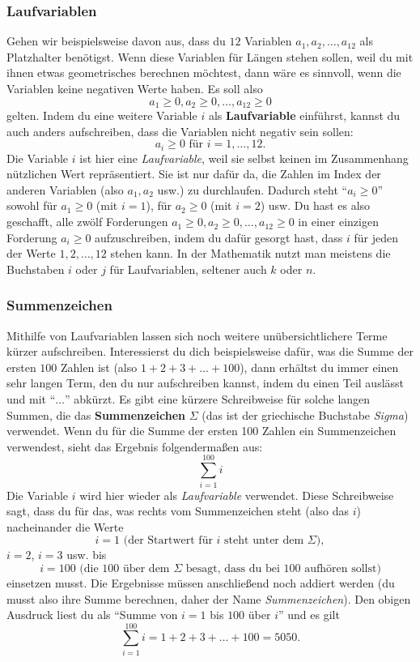 \documentclass[../../main.tex]{subfiles}
\begin{document}
\subsubsection*{Laufvariablen}
Gehen wir beispielsweise davon aus, dass du $12$ Variablen $a_1,a_2,\dots,a_{12}$ als Platzhalter benötigst. Wenn diese
Variablen für Längen stehen sollen, weil du mit ihnen etwas geometrisches berechnen möchtest, dann wäre es sinnvoll,
wenn die Variablen keine negativen Werte haben. Es soll also 
\[a_1\geq 0, a_2\geq 0,\dots,a_{12}\geq 0\] 
gelten. Indem du eine weitere Variable $i$ als \textbf{Laufvariable} einführst, kannst du auch anders aufschreiben, dass
die Variablen nicht negativ sein sollen: 
\[a_i\geq 0 \text{ für } i=1,\dots,12.\]
Die Variable $i$ ist hier eine \emph{Laufvariable}, weil sie selbst keinen im Zusammenhang nützlichen Wert repräsentiert.
Sie ist nur dafür da, die Zahlen im Index der anderen Variablen (also $a_1,a_2$ usw.) zu durchlaufen. Dadurch steht
\enquote{$a_i\geq 0$} sowohl für $a_1\geq 0$ (mit $i=1$), für $a_2\geq 0$ (mit $i=2$) usw. Du hast es also geschafft,
alle zwölf Forderungen $a_1\geq 0, a_2\geq 0,\dots,a_{12}\geq 0$ in einer einzigen Forderung $a_i\geq 0$ aufzuschreiben,
indem du dafür gesorgt hast, dass $i$ für jeden der Werte $1,2,\dots,12$ stehen kann. In der Mathematik nutzt man
meistens die Buchstaben $i$ oder $j$ für Laufvariablen, seltener auch $k$ oder $n$.

\subsubsection*{Summenzeichen}
Mithilfe von Laufvariablen lassen sich noch weitere unübersichtlichere Terme kürzer aufschreiben. Interessierst du dich
beispielsweise dafür, was die Summe der ersten $100$ Zahlen ist (also $1+2+3+\dots+100$), dann erhältst du immer einen
sehr langen Term, den du nur aufschreiben kannst, indem du einen Teil auslässt und mit \enquote{$\dots$} abkürzt. Es
gibt eine kürzere Schreibweise für solche langen Summen, die das \textbf{Summenzeichen} $\Sigma$ (das ist der
griechische Buchstabe \emph{Sigma}) verwendet. Wenn du für die Summe der ersten 100 Zahlen ein Summenzeichen verwendest,
sieht das Ergebnis folgendermaßen aus:
\[\sum_{i=1}^{100}i\]
Die Variable $i$ wird hier wieder als \emph{Laufvariable} verwendet. Diese Schreibweise sagt, dass du für das, was
rechts vom Summenzeichen steht (also das $i$) nacheinander die Werte
\[i=1 \text{ (der Startwert für $i$ steht unter dem }\Sigma),\]
$i=2$, $i=3$ usw. bis
\[i=100 \text{ (die 100 über dem $\Sigma$ besagt, dass du bei $100$ aufhören sollst)}\]
einsetzen musst. Die Ergebnisse müssen anschließend noch addiert werden (du musst also ihre Summe berechnen, daher der
Name \emph{Summenzeichen}). Den obigen Ausdruck liest du als \enquote{Summe von $i=1$ bis $100$ über $i$} und es gilt
\[\sum_{i=1}^{100}i=1+2+3+\dots+100=5050.\]
\end{document}
